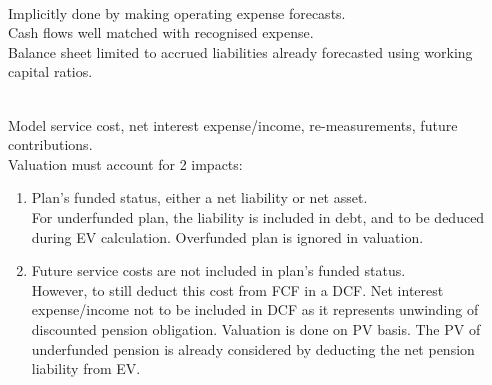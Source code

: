 \begin{method}  \\
Implicitly done by making operating expense forecasts.\\
Cash flows well matched with recognised expense.\\
Balance sheet limited to accrued liabilities already forecasted using working capital ratios.
\end{method}

\begin{method}  \\
Model service cost, net interest expense/income, re-measurements, future contributions.\\
Valuation must account for 2 impacts:
\begin{enumerate}[label=\roman*.]
\setlength{\itemsep}{0pt}
\item Plan’s funded status, either a net liability or net asset.\\
For underfunded plan, the liability is included in debt, and to be deduced during EV calculation. Overfunded plan is ignored in valuation.
\item Future service costs are not included in plan’s funded status.\\
However, to still deduct this cost from FCF in a DCF. Net interest expense/income not to be included in DCF as it represents unwinding of discounted pension obligation. Valuation is done on PV basis. The PV of underfunded pension is already considered by deducting the net pension liability from EV. 
\end{enumerate}
\end{method}




